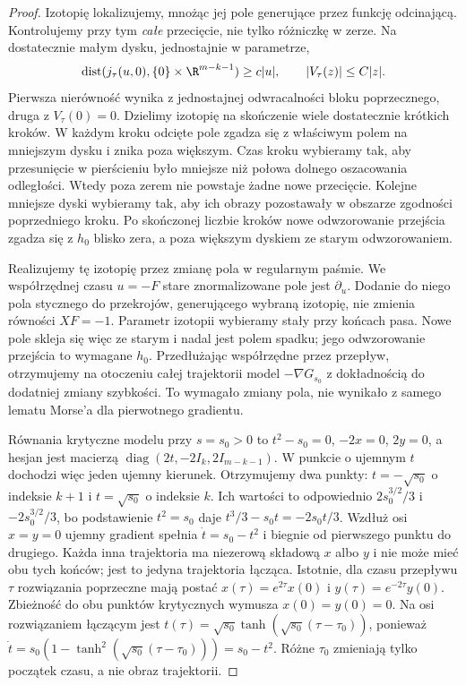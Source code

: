 \begin{proof}
Izotopię lokalizujemy, mnożąc jej pole generujące
przez funkcję odcinającą. Kontrolujemy przy tym
\emph{całe} przecięcie, nie tylko różniczkę w zerze.
Na dostatecznie małym dysku, jednostajnie w parametrze,
\[
 \operatorname{dist}(j_\tau(u,0),\{0\}\times\R^{m-k-1})
       \geq c|u|,\qquad |V_\tau(z)|\leq C|z|.
\]
Pierwsza nierówność wynika z jednostajnej odwracalności
bloku poprzecznego, druga z $V_\tau(0)=0$.
Dzielimy izotopię na skończenie wiele dostatecznie
krótkich kroków. W każdym kroku odcięte pole zgadza się
z właściwym polem na mniejszym dysku i znika poza większym.
Czas kroku wybieramy tak, aby przesunięcie w pierścieniu
było mniejsze niż połowa dolnego oszacowania odległości.
Wtedy poza zerem nie powstaje żadne nowe przecięcie.
Kolejne mniejsze dyski wybieramy tak, aby ich obrazy
pozostawały w obszarze zgodności poprzedniego kroku.
Po skończonej liczbie kroków nowe odwzorowanie przejścia
zgadza się z $h_0$ blisko zera, a poza większym dyskiem
ze starym odwzorowaniem.

Realizujemy tę izotopię przez zmianę pola w regularnym paśmie.
We współrzędnej czasu $u=-F$ stare znormalizowane pole
jest $\partial_u$. Dodanie do niego pola stycznego
do przekrojów, generującego wybraną izotopię,
nie zmienia równości $XF=-1$.
Parametr izotopii wybieramy stały przy końcach pasa.
Nowe pole skleja się więc ze starym i nadal jest polem
spadku; jego odwzorowanie przejścia to wymagane $h_0$.
Przedłużając współrzędne przez przepływ, otrzymujemy
na otoczeniu całej trajektorii model $-\nabla G_{s_0}$
z dokładnością do dodatniej zmiany szybkości.
To wymagało zmiany pola, nie wynikało z samego
lematu Morse'a dla pierwotnego gradientu.

Równania krytyczne modelu przy $s=s_0>0$ to
$t^2-s_0=0$, $-2x=0$, $2y=0$, a hesjan jest macierzą
$\operatorname{diag}(2t,-2I_k,2I_{m-k-1})$.
W punkcie o ujemnym $t$ dochodzi więc jeden ujemny kierunek.
Otrzymujemy dwa punkty:
$t=-\sqrt{s_0}$ o indeksie $k+1$
i $t=\sqrt{s_0}$ o indeksie $k$.
Ich wartości to odpowiednio $2s_0^{3/2}/3$ i $-2s_0^{3/2}/3$,
bo podstawienie $t^2=s_0$ daje $t^3/3-s_0t=-2s_0t/3$.
Wzdłuż osi $x=y=0$ ujemny gradient
spełnia $\dot t=s_0-t^2$ i biegnie
od pierwszego punktu do drugiego.
Każda inna trajektoria ma niezerową
składową $x$ albo $y$ i nie może mieć
obu tych końców; jest to jedyna
trajektoria łącząca.
Istotnie, dla czasu przepływu $\tau$ rozwiązania poprzeczne
mają postać $x(\tau)=e^{2\tau}x(0)$ i
$y(\tau)=e^{-2\tau}y(0)$. Zbieżność do obu punktów krytycznych
wymusza $x(0)=y(0)=0$. Na osi rozwiązaniem łączącym jest
$t(\tau)=\sqrt{s_0}\tanh(\sqrt{s_0}(\tau-\tau_0))$,
ponieważ $\dot t=s_0(1-\tanh^2(\sqrt{s_0}(\tau-\tau_0)))
=s_0-t^2$. Różne $\tau_0$ zmieniają
tylko początek czasu, a nie obraz trajektorii.


\end{proof}
